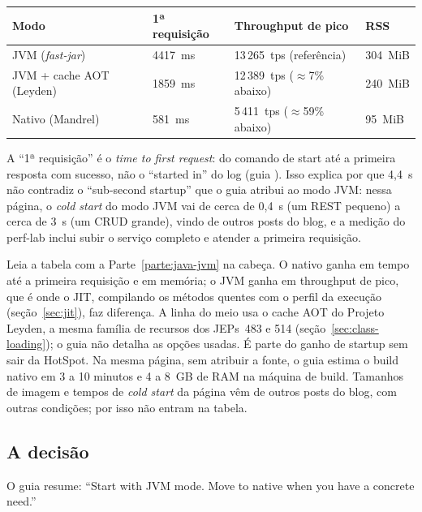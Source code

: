 \small
\begin{longtable}{@{}p{4cm} p{2.4cm} p{3.6cm} p{1.8cm}@{}}
\toprule
Modo & 1ª requisição & Throughput de pico & RSS \\
\midrule \endhead
JVM (\emph{fast-jar}) & 4417~ms & 13\,265~tps (referência) & 304~MiB \\
JVM + cache AOT (Leyden) & 1859~ms & 12\,389~tps ($\approx$7\% abaixo) &
  240~MiB \\
Nativo (Mandrel) & 581~ms & 5\,411~tps ($\approx$59\% abaixo) & 95~MiB \\
\bottomrule
\end{longtable}
\normalsize

A \enquote{1ª requisição} é o \emph{time to first request}: do comando
de start até a primeira resposta com sucesso, não o \enquote{started
in} do log (guia ). Isso
explica por que 4,4~s não contradiz o \enquote{sub-second startup} que o
guia  atribui ao modo JVM: nessa
página, o \emph{cold start} do
modo JVM vai de cerca de 0,4~s (um REST pequeno) a cerca de 3~s (um CRUD
grande), vindo de outros posts do blog, e a medição do perf-lab inclui
subir o serviço completo e atender a primeira requisição.

Leia a tabela com a Parte~\ref{parte:java-jvm} na cabeça. O nativo ganha em tempo até a
primeira requisição e em memória; o JVM ganha em throughput de pico, que
é onde o JIT, compilando os métodos quentes com o perfil da execução
(seção~\ref{sec:jit}), faz diferença. A linha do meio usa o cache AOT
do Projeto Leyden, a mesma família de recursos dos JEPs~483 e 514
(seção~\ref{sec:class-loading}); o guia não detalha as opções usadas.
É parte do ganho de startup sem sair da HotSpot. Na mesma página, sem atribuir a fonte, o
guia estima o build nativo em 3 a 10 minutos e 4 a 8~GB de RAM na
máquina de build. Tamanhos de imagem e tempos de \emph{cold start} da
página vêm de outros posts do blog, com outras condições; por isso não
entram na tabela.

\subsection*{A decisão}

O guia resume: \enquote{Start with JVM mode. Move to native when you
have a concrete need.}

